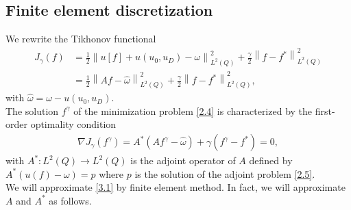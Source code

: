 \documentclass[notitlepage,a4paper,fleqn,9pt]{icmfarticle}
\begin{document}
\begin{multicols}{2}
\subsection{Finite element discretization}
We rewrite the Tikhonov functional
\begin{align*}
J_\gamma(f)&=\frac{1}{2}\left\| u[f]+ u(u_0, u_D)-\omega\right\|^2_{L^2(Q)}+\frac{\gamma}{2}\left\|f-f^*\right\|^2_{L^2(Q)}\\
&=\frac{1}{2}\left\|Af-\hat{\omega}\right\|^2_{L^2(Q)}+\frac{\gamma}{2}\left\|f-f^*\right\|^2_{L^2(Q)},
\end{align*}
with $\hat{\omega}=\omega- u(u_0, u_D)$.
\\
The solution $f^\gamma$ of the minimization problem \eqref{2.4} is characterized by the first-order optimality condition
\begin{align}\label{3.1}
\nabla J_\gamma(f^\gamma)= A^*(Af^\gamma-\hat{\omega})+\gamma(f^\gamma-f^*)=0,
\end{align}
with $A^*: L^2(Q)\to L^2(Q)$ is the adjoint operator of $A$ defined by $A^*\left( u(f) - \omega\right) = p$ where $p$ is the solution of the adjoint problem \eqref{2.5}. 
\\
We will approximate \eqref{3.1} by finite element method. In fact, we will approximate $A$ and $A^*$ as follows.


\end{multicols}
\end{document}

